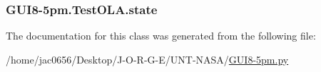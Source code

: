 \subsubsection[{\texorpdfstring{state}{state}}]{\setlength{\rightskip}{0pt plus 5cm}G\+U\+I8-\/5pm.\+Test\+O\+L\+A.\+state\hspace{0.3cm}{\ttfamily [static]}}\hypertarget{classGUI8-5pm_1_1TestOLA_a68f040d3d08f4827d1ddaed5086ba9cd}{}\label{classGUI8-5pm_1_1TestOLA_a68f040d3d08f4827d1ddaed5086ba9cd}


The documentation for this class was generated from the following file\+:\begin{DoxyCompactItemize}
\item 
/home/jac0656/\+Desktop/\+J-\/\+O-\/\+R-\/\+G-\/\+E/\+U\+N\+T-\/\+N\+A\+S\+A/\hyperlink{GUI8-5pm_8py}{G\+U\+I8-\/5pm.\+py}\end{DoxyCompactItemize}
